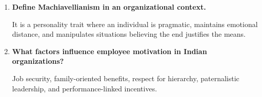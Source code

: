 \documentclass[11pt,a4paper]{article}
\newcommand{\Q}[1]{\textbf{#1}\par\noindent\ignorespaces}
\begin{document}
\begin{tcolorbox}[exambox, title={\textbf{Frequently Asked / Viva Questions}}]
\begin{enumerate}[leftmargin=*, itemsep=4pt]
  \item \Q{Define Machiavellianism in an organizational context.}
    It is a personality trait where an individual is pragmatic, maintains emotional distance, and manipulates situations believing the end justifies the means.
  
  \item \Q{What factors influence employee motivation in Indian organizations?}
    Job security, family-oriented benefits, respect for hierarchy, paternalistic leadership, and performance-linked incentives.
\end{enumerate}
\end{tcolorbox}
\end{document}
